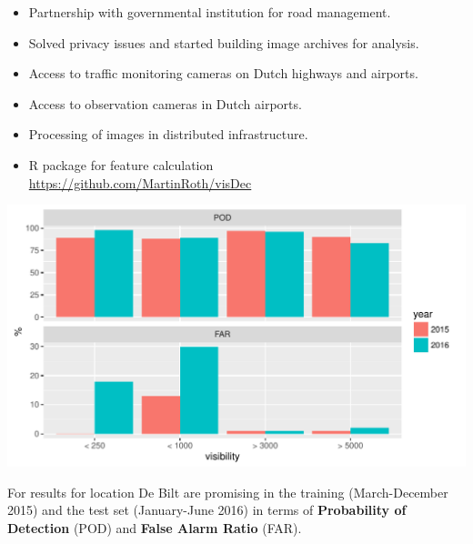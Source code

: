 \documentclass{article}
\begin{document}
\begin{tcolorbox}[colback=red!5!white,colframe=red!75!black,title=Overall Project Results]
\begin{itemize}
\item{Partnership with governmental institution for road management.}
\item{Solved privacy issues and started building image archives for analysis.}
\item{Access to traffic monitoring cameras on Dutch highways and airports.}
\item{Access to observation cameras in Dutch airports.}
\item{Processing of images in distributed infrastructure.}
\item{R package for feature calculation\\ \url{https://github.com/MartinRoth/visDec}}
\end{itemize}
\end{tcolorbox}

\begin{minipage}[b]{\columnwidth}
	\begin{center}
	\includegraphics[width=0.85\columnwidth]{PODandFAR3-1}
	\label{PODFAR}
	\end{center}
\end{minipage}
For results for location De Bilt are promising in the training 
(March-December 2015) and the test set (January-June 2016) in terms of 
\textbf{Probability of Detection} (POD) and \textbf{False Alarm Ratio} (FAR).


\vspace*{-.5cm}
\end{document}
